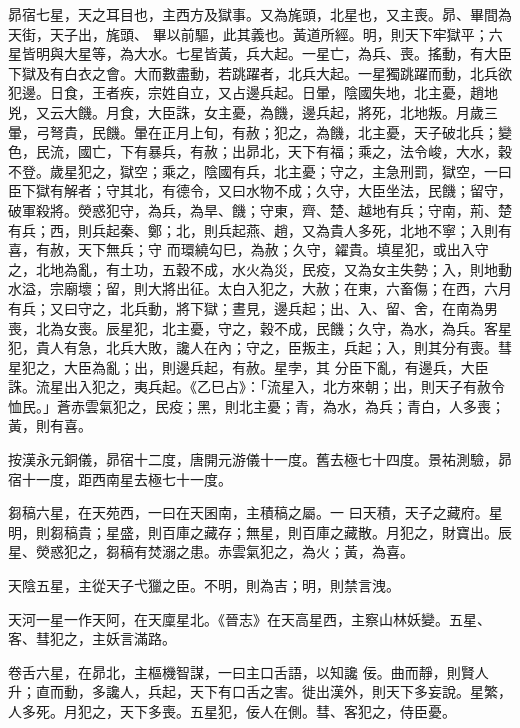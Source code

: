 \begin{pinyinscope}
昴宿七星，天之耳目也，主西方及獄事。又為旄頭，北星也，又主喪。昴、畢間為天街，天子出，旄頭、
 畢以前驅，此其義也。黃道所經。明，則天下牢獄平；六星皆明與大星等，為大水。七星皆黃，兵大起。一星亡，為兵、喪。搖動，有大臣下獄及有白衣之會。大而數盡動，若跳躍者，北兵大起。一星獨跳躍而動，北兵欲犯邊。日食，王者疾，宗姓自立，又占邊兵起。日暈，陰國失地，北主憂，趙地兇，又云大饑。月食，大臣誅，女主憂，為饑，邊兵起，將死，北地叛。月歲三
 暈，弓弩貴，民饑。暈在正月上旬，有赦；犯之，為饑，北主憂，天子破北兵；變色，民流，國亡，下有暴兵，有赦；出昴北，天下有福；乘之，法令峻，大水，穀不登。歲星犯之，獄空；乘之，陰國有兵，北主憂；守之，主急刑罰，獄空，一曰臣下獄有解者；守其北，有德令，又曰水物不成；久守，大臣坐法，民饑；留守，破軍殺將。熒惑犯守，為兵，為旱、饑；守東，齊、楚、越地有兵；守南，荊、楚有兵；西，則兵起秦、鄭；北，則兵起燕、趙，又為貴人多死，北地不寧；入則有喜，有赦，天下無兵；守
 而環繞勾巳，為赦；久守，糴貴。填星犯，或出入守之，北地為亂，有土功，五穀不成，水火為災，民疫，又為女主失勢；入，則地動水溢，宗廟壞；留，則大將出征。太白入犯之，大赦；在東，六畜傷；在西，六月有兵；又曰守之，北兵動，將下獄；晝見，邊兵起；出、入、留、舍，在南為男喪，北為女喪。辰星犯，北主憂，守之，穀不成，民饑；久守，為水，為兵。客星犯，貴人有急，北兵大敗，讒人在內；守之，臣叛主，兵起；入，則其分有喪。彗星犯之，大臣為亂；出，則邊兵起，有赦。星孛，其
 分臣下亂，有邊兵，大臣誅。流星出入犯之，夷兵起。《乙巳占》：「流星入，北方來朝；出，則天子有赦令恤民。」蒼赤雲氣犯之，民疫；黑，則北主憂；青，為水，為兵；青白，人多喪；黃，則有喜。



 按漢永元銅儀，昴宿十二度，唐開元游儀十一度。舊去極七十四度。景祐測驗，昴宿十一度，距西南星去極七十一度。



 芻稿六星，在天苑西，一曰在天囷南，主積稿之屬。一
 曰天積，天子之藏府。星明，則芻稿貴；星盛，則百庫之藏存；無星，則百庫之藏散。月犯之，財寶出。辰星、熒惑犯之，芻稿有焚溺之患。赤雲氣犯之，為火；黃，為喜。



 天陰五星，主從天子弋獵之臣。不明，則為吉；明，則禁言洩。



 天河一星一作天阿，在天廩星北。《晉志》在天高星西，主察山林妖變。五星、客、彗犯之，主妖言滿路。



 卷舌六星，在昴北，主樞機智謀，一曰主口舌語，以知讒
 佞。曲而靜，則賢人升；直而動，多讒人，兵起，天下有口舌之害。徙出漢外，則天下多妄說。星繁，人多死。月犯之，天下多喪。五星犯，佞人在側。彗、客犯之，侍臣憂。




\end{pinyinscope}
